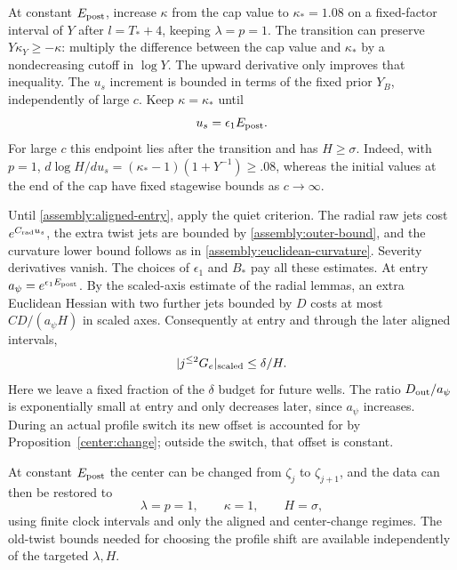 At constant $E_{\rm post}$, increase $\kappa$ from the cap value
to $\kappa_*=1.08$ on a fixed-factor interval of $Y$ after
$l=T_*+4$, keeping $\lambda=p=1$. The transition can preserve
$Y\kappa_Y\geq-\kappa$: multiply the difference between the cap
value and $\kappa_*$ by a nondecreasing cutoff in $\log Y$.
The upward derivative only improves that inequality.
The $u_s$ increment is bounded in terms of the fixed prior $Y_B$,
independently of large $c$. Keep $\kappa=\kappa_*$ until
\begin{equation}\label{assembly:aligned-entry}
 u_s=\epsilon_1E_{\rm post}.
\end{equation}
For large $c$ this endpoint lies after the transition and has
$H\geq\sigma$. Indeed, with $p=1$,
$d\log H/du_s=(\kappa_*-1)(1+Y^{-1})\geq.08$,
whereas the initial values at the end of the cap have fixed
stagewise bounds as $c\to\infty$.

Until \eqref{assembly:aligned-entry}, apply the quiet criterion.
The radial raw jets cost $e^{C_{\rm rad}u_s}$, the extra twist
jets are bounded by \eqref{assembly:outer-bound}, and the curvature
lower bound follows as in \eqref{assembly:euclidean-curvature}.
Severity derivatives vanish. The choices of $\epsilon_1$ and $B_*$
pay all these estimates. At entry $a_\psi=e^{\epsilon_1E_{\rm post}}$.
By the scaled-axis estimate of the radial lemmas, an extra
Euclidean Hessian with two further jets bounded by $D$ costs at
most $CD/(a_\psi H)$ in scaled axes. Consequently at entry and
through the later aligned intervals,
\begin{equation}\label{assembly:aligned-extra}
 |j^{\leq2}G_e|_{\rm scaled}\leq\delta/H.
\end{equation}
Here we leave a fixed fraction of the $\delta$ budget for future
wells. The ratio $D_{\rm out}/a_\psi$ is exponentially small at
entry and only decreases later, since $a_\psi$ increases.
During an actual profile switch its new offset is accounted for
by Proposition~\ref{center:change}; outside the switch, that offset
is constant.

\begin{lemma}\label{assembly:change-order}
At constant $E_{\rm post}$ the center can be changed from $\zeta_j$
to $\zeta_{j+1}$, and the data can then be restored to
\[
 \lambda=p=1,\qquad \kappa=1,\qquad H=\sigma,
\]
using finite clock intervals and only the aligned and center-change
regimes. The old-twist bounds needed for choosing the profile
shift are available independently of the targeted $\lambda,H$.
\end{lemma}

